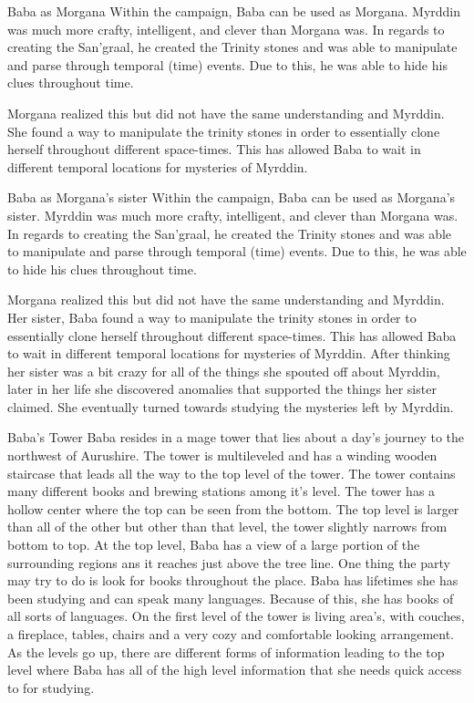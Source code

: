 \begin{commentbox}{Baba as Morgana}
	Within the campaign, Baba can be used as Morgana. Myrddin was much more crafty, intelligent, and clever than Morgana was. In regards to creating the San'graal, he created the Trinity stones and was able to manipulate and parse through temporal (time) events. Due to this, he was able to hide his clues throughout time. 
	
	Morgana realized this but did not have the same understanding and Myrddin. She found a way to manipulate the trinity stones in order to essentially clone herself throughout different space-times. This has allowed Baba to wait in different temporal locations for mysteries of Myrddin.
\end{commentbox}

\begin{commentbox}{Baba as Morgana's sister}
	Within the campaign, Baba can be used as Morgana's sister. Myrddin was much more crafty, intelligent, and clever than Morgana was. In regards to creating the San'graal, he created the Trinity stones and was able to manipulate and parse through temporal (time) events. Due to this, he was able to hide his clues throughout time. 
	
	Morgana realized this but did not have the same understanding and Myrddin. Her sister, Baba found a way to manipulate the trinity stones in order to essentially clone herself throughout different space-times. This has allowed Baba to wait in different temporal locations for mysteries of Myrddin. After thinking her sister was a bit crazy for all of the things she spouted off about Myrddin, later in her life she discovered anomalies that supported the things her sister claimed. She eventually turned towards studying the mysteries left by Myrddin.
\end{commentbox}

\begin{commentbox}{Baba's Tower}
	Baba resides in a mage tower that lies about a day's journey to the northwest of Aurushire. The tower is multileveled and has a winding wooden staircase that leads all the way to the top level of the tower. The tower contains many different books and brewing stations among it's level. The tower has a hollow center where the top can be seen from the bottom. The top level is larger than all of the other but other than that level, the tower slightly narrows from bottom to top. At the top level, Baba has a view of a large portion of the surrounding regions ans it reaches just above the tree line. One thing the party may try to do is look for books throughout the place. Baba has lifetimes she has been studying and can speak many languages. Because of this, she has books of all sorts of languages. On the first level of the tower is living area's, with couches, a fireplace, tables, chairs and a very cozy and comfortable looking arrangement. As the levels go up, there are different forms of information leading to the top level where Baba has all of the high level information that she needs quick access to for studying.
\end{commentbox}

